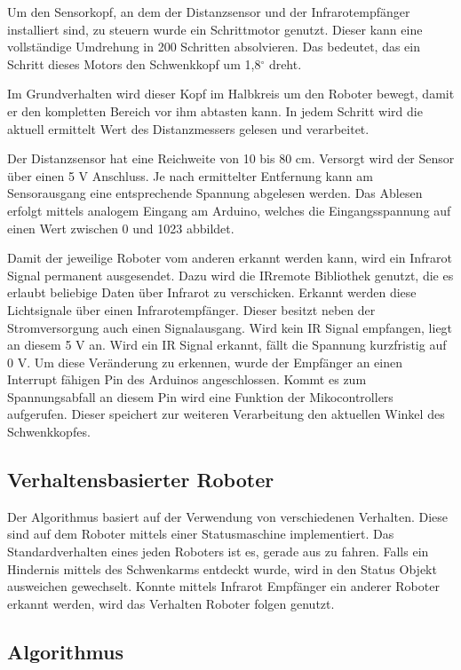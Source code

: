 \documentclass[12pt,a4paper,titlepage]{article}
\begin{document}
Um den Sensorkopf, an dem der Distanzsensor und der Infrarotempfänger installiert sind, zu steuern wurde ein Schrittmotor genutzt. Dieser kann eine vollständige Umdrehung in 200 Schritten absolvieren. Das bedeutet, das ein Schritt dieses Motors den Schwenkkopf um 1{,}8$^\circ$ dreht.

Im Grundverhalten wird dieser Kopf im Halbkreis um den Roboter bewegt, damit er den kompletten Bereich vor ihm abtasten kann. In jedem Schritt wird die aktuell ermittelt Wert des Distanzmessers gelesen und verarbeitet.

Der Distanzsensor hat eine Reichweite von 10 bis 80 cm. Versorgt wird der Sensor über einen 5 V Anschluss. Je nach ermittelter Entfernung kann am Sensorausgang eine entsprechende Spannung abgelesen werden. Das Ablesen erfolgt mittels analogem Eingang am Arduino, welches die Eingangsspannung auf einen Wert zwischen 0 und 1023 abbildet.

Damit der jeweilige Roboter vom anderen erkannt werden kann, wird ein Infrarot Signal permanent ausgesendet. Dazu wird die IRremote Bibliothek genutzt, die es erlaubt beliebige Daten über Infrarot zu verschicken. Erkannt werden diese Lichtsignale über einen Infrarotempfänger. Dieser besitzt neben der Stromversorgung auch einen Signalausgang. Wird kein IR Signal empfangen, liegt an diesem 5 V an. Wird ein IR Signal erkannt, fällt die Spannung kurzfristig auf 0 V. Um diese Veränderung zu erkennen, wurde der Empfänger an einen Interrupt fähigen Pin des Arduinos angeschlossen. Kommt es zum Spannungsabfall an diesem Pin wird eine Funktion der Mikocontrollers aufgerufen. Dieser speichert zur weiteren Verarbeitung den aktuellen Winkel des Schwenkkopfes.

\subsection{Verhaltensbasierter Roboter}

Der Algorithmus basiert auf der Verwendung von verschiedenen Verhalten. Diese sind auf dem Roboter mittels einer Statusmaschine implementiert. Das Standardverhalten eines jeden Roboters ist es, gerade aus zu fahren. Falls ein Hindernis mittels des Schwenkarms entdeckt wurde, wird in den Status Objekt ausweichen gewechselt. Konnte mittels Infrarot Empfänger ein anderer Roboter erkannt werden, wird das Verhalten Roboter folgen genutzt.

\subsection{Algorithmus}
\end{document}
